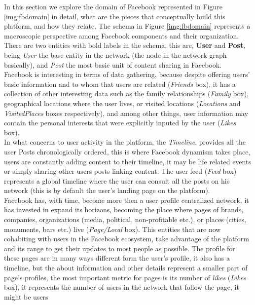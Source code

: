 \indent In this section we explore the domain of Facebook represented in Figure \ref{img:fbdomain} in detail, what are the pieces that conceptually build
this platform, and how they relate. The schema in Figure \ref{img:fbdomain} represents a macroscopic perspective among Facebook components and their organization.\\
\indent There are two entities with bold labels in the schema, this are, \textbf{User} and \textbf{Post}, being
\textit{User} the base entity in the network (the node in the network graph basically), and \textit{Post} the most basic unit of content sharing in Facebook.\\
\indent Facebook is interesting in terms of data gathering, because despite offering users' basic information
and to whom that users are related (\textit{Friends} box), it has a collection of other interesting data
such as the family relationships (\textit{Family} box), geographical locations where the user lives, or
visited locations (\textit{Locations} and \textit{VisitedPlaces} boxes respectively), and among other things, user information
may contain the personal interests that were explicitly inputed by the user (\textit{Likes} box).\\
\indent In what concerns to user activity in the platform, the \textit{Timeline}, provides all the user
Posts chronologically ordered, this is where Facebook dynamism takes place, users are constantly
adding content to their timeline, it may be life related events or simply sharing other users posts linking content. The user feed (\textit{Feed} box) represents
a global timeline where the user can consult all the posts on his network (this is by default the user's landing page on the platform).\\
\indent Facebook has, with time, become more then a user profile centralized network, it has invested in expand its horizons, becoming
the place where pages of brands, companies, organizations (media, political, non-profitable etc.), or places (cities, monuments, bars etc.) live (\textit{Page/Local} box).
This entities that are now cohabiting with users in the Facebook ecosystem, take advantage of the platform and its range to get their updates to most people as possible. The profile
for these pages are in many ways different form the user's profile, it also has a timeline, but the about information and other details represent a smaller part of page's profiles,
the most important metric for pages is its number of \textit{likes} (\textit{Likes} box), it represents the number of users in the network that follow the page, it might be users
